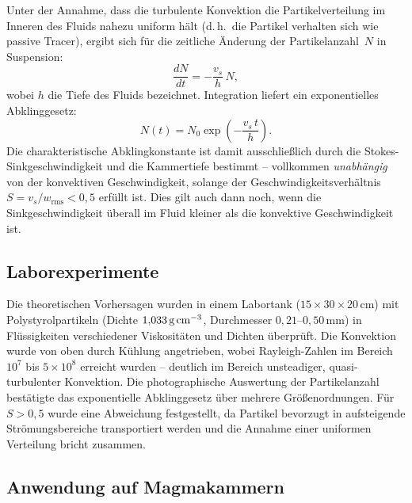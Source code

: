 \documentclass[a4paper,12pt]{article}
\begin{document}
Unter der Annahme, dass die turbulente Konvektion die Partikelverteilung im
Inneren des Fluids nahezu uniform hält (d.\,h.\ die Partikel verhalten sich wie
passive Tracer), ergibt sich für die zeitliche Änderung der Partikelanzahl~$N$
in Suspension:
\begin{equation}
    \frac{dN}{dt} = -\frac{v_s}{h}\,N,
\end{equation}
wobei $h$ die Tiefe des Fluids bezeichnet. Integration liefert ein exponentielles
Abklinggesetz:
\begin{equation}
    N(t) = N_0 \exp\!\left(-\frac{v_s\,t}{h}\right).
\end{equation}
Die charakteristische Abklingkonstante ist damit ausschließlich durch die
Stokes-Sinkgeschwindigkeit und die Kammertiefe bestimmt -- vollkommen
\emph{unabhängig} von der konvektiven Geschwindigkeit, solange der
Geschwindigkeitsverhältnis $S = v_s / w_\mathrm{rms} < 0{,}5$ erfüllt ist. Dies
gilt auch dann noch, wenn die Sinkgeschwindigkeit überall im Fluid kleiner als
die konvektive Geschwindigkeit ist.

\subsection*{Laborexperimente}

Die theoretischen Vorhersagen wurden in einem Labortank ($15 \times 30 \times
20\,\text{cm}$) mit Polystyrolpartikeln (Dichte $1{,}033\,\text{g\,cm}^{-3}$,
Durchmesser $0{,}21$--$0{,}50\,\text{mm}$) in Flüssigkeiten verschiedener
Viskositäten und Dichten überprüft. Die Konvektion wurde von oben durch Kühlung
angetrieben, wobei Rayleigh-Zahlen im Bereich $10^7$ bis $5 \times 10^8$
erreicht wurden -- deutlich im Bereich unsteadiger, quasi-turbulenter Konvektion.
Die photographische Auswertung der Partikelanzahl bestätigte das exponentielle
Abklinggesetz über mehrere Größenordnungen. Für $S > 0{,}5$ wurde eine
Abweichung festgestellt, da Partikel bevorzugt in aufsteigende Strömungsbereiche
transportiert werden und die Annahme einer uniformen Verteilung bricht zusammen.

\subsection*{Anwendung auf Magmakammern}
\end{document}
